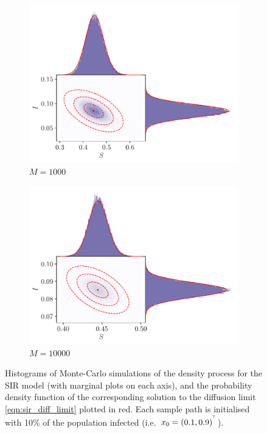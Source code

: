 \begin{figure}
\begin{center}
\begin{subfigure}{0.49\textwidth}
			\includegraphics[width=\textwidth]{chp06_applications/figures/sir/sir_pairwise_1000}
			\caption{\(M = 1000\)}
			\label{fig:sir_gauss_rels_3}
		\end{subfigure}\begin{subfigure}{0.49\textwidth}
			\includegraphics[width=\textwidth]{chp06_applications/figures/sir/sir_pairwise_10000}
			\caption{\(M = 10000\)}
			\label{fig:sir_gauss_rels_4}
		\end{subfigure}
		\caption{Histograms of Monte-Carlo simulations of the density process for the SIR model (with marginal plots on each axis), and the probability density function of the corresponding solution to the diffusion limit \cref{eqn:sir_diff_limit} plotted in red.
			Each sample path is initialised with 10\% of the population infected (i.e.\ \(x_0 = \left(0.1, 0.9\right)^{^{\!\top}}\)).}
		\label{fig:sir_gauss_rels}
	\end{center}
\end{figure}

